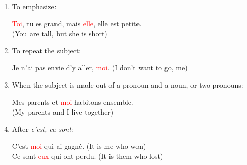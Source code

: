 \documentclass{book}
\begin{document}
\begin{enumerate}
\begin{center}
                    Je n'ai vu qu'\textcolor{red}{elle}. \quad (I only saw her)
                \end{center}
                The preposition \textit{à} and \textit{de} might be after \textit{que}, depending on the verb.
            \item To emphasize:
                \begin{center}
                    \textcolor{red}{Toi}, tu es grand, mais \textcolor{red}{elle}, elle est petite. \\
                    (You are tall, but she is short)
                \end{center}
            \item To repeat the subject:
                \begin{center}
                    Je n'ai pas envie d'y aller, \textcolor{red}{moi}. \quad (I don't want to go, me)
                \end{center}
            \item When the subject is made out of a pronoun and a noun, or two pronouns:
                \begin{center}
                    Mes parents et \textcolor{red}{moi} habitons ensemble. \\
                    (My parents and I live together)
                \end{center}
            \item After \textit{c'est, ce sont}:
                \begin{center}
                    C'est \textcolor{red}{moi} qui ai gagné. \quad (It is me who won) \\
                    Ce sont \textcolor{red}{eux} qui ont perdu. \quad (It is them who lost)
                \end{center}
        \end{enumerate}
\end{document}
